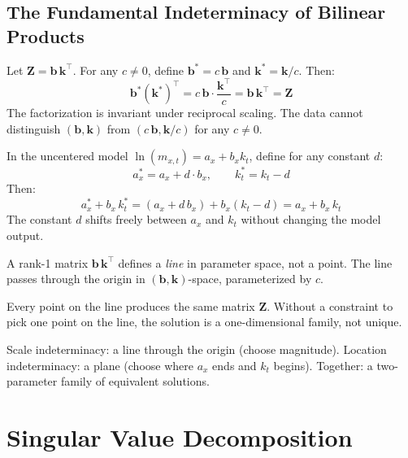 \documentclass[11pt,a4paper]{article}
\begin{document}
\subsection{The Fundamental Indeterminacy of Bilinear Products}

\begin{formaldef}
Let $\bm{Z} = \bm{b}\,\bm{k}^\top$. For any $c \neq 0$, define $\bm{b}^* = c\,\bm{b}$ and
$\bm{k}^* = \bm{k}/c$. Then:
\[
\bm{b}^* (\bm{k}^*)^\top = c\,\bm{b} \cdot \frac{\bm{k}^\top}{c} = \bm{b}\,\bm{k}^\top = \bm{Z}
\]
The factorization is invariant under reciprocal scaling. The data cannot distinguish
$(\bm{b}, \bm{k})$ from $(c\,\bm{b}, \bm{k}/c)$ for any $c \neq 0$.
\end{formaldef}

\begin{formaldef}
In the uncentered model $\ln(m_{x,t}) = a_x + b_x k_t$, define for any constant $d$:
\[
a_x^* = a_x + d \cdot b_x, \qquad k_t^* = k_t - d
\]
Then:
\[
a_x^* + b_x \, k_t^* = (a_x + d\,b_x) + b_x(k_t - d) = a_x + b_x\,k_t
\]
The constant $d$ shifts freely between $a_x$ and $k_t$ without changing the model output.
\end{formaldef}

\begin{intuition}
A rank-1 matrix $\bm{b}\,\bm{k}^\top$ defines a \emph{line} in parameter space, not a point.
The line passes through the origin in $(\bm{b}, \bm{k})$-space, parameterized by $c$.

Every point on the line produces the same matrix $\bm{Z}$. Without a constraint to pick
one point on the line, the solution is a one-dimensional family, not unique.

Scale indeterminacy: a line through the origin (choose magnitude).
Location indeterminacy: a plane (choose where $a_x$ ends and $k_t$ begins).
Together: a two-parameter family of equivalent solutions.
\end{intuition}

\section{Singular Value Decomposition}
\end{document}
